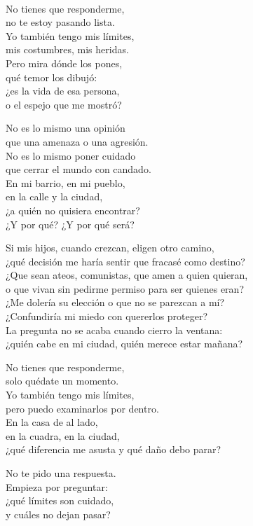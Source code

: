 \begin{lyrics}
\\
No tienes que responderme,\\
no te estoy pasando lista.\\
Yo también tengo mis límites,\\
mis costumbres, mis heridas.\\
Pero mira dónde los pones,\\
qué temor los dibujó:\\
¿es la vida de esa persona,\\
o el espejo que me mostró?

No es lo mismo una opinión\\
que una amenaza o una agresión.\\
No es lo mismo poner cuidado\\
que cerrar el mundo con candado.\\
En mi barrio, en mi pueblo,\\
en la calle y la ciudad,\\
¿a quién no quisiera encontrar?\\
¿Y por qué? ¿Y por qué será?

Si mis hijos, cuando crezcan, eligen otro camino,\\
¿qué decisión me haría sentir que fracasé como destino?\\
¿Que sean ateos, comunistas, que amen a quien quieran,\\
o que vivan sin pedirme permiso para ser quienes eran?\\
¿Me dolería su elección o que no se parezcan a mí?\\
¿Confundiría mi miedo con quererlos proteger?\\
La pregunta no se acaba cuando cierro la ventana:\\
¿quién cabe en mi ciudad, quién merece estar mañana?

No tienes que responderme,\\
solo quédate un momento.\\
Yo también tengo mis límites,\\
pero puedo examinarlos por dentro.\\
En la casa de al lado,\\
en la cuadra, en la ciudad,\\
¿qué diferencia me asusta
 y qué daño debo parar?

No te pido una respuesta.\\
Empieza por preguntar:\\
¿qué límites son cuidado,\\
y cuáles no dejan pasar?
\end{lyrics}

